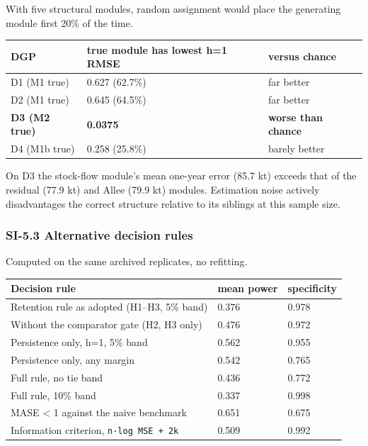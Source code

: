 \documentclass[11pt]{article}
\begin{document}
With five structural modules, random assignment would place the
generating module first 20\% of the time.

{\def\LTcaptype{none} %
\begin{longtable}[]{@{}lll@{}}
\toprule\noalign{}
DGP & true module has lowest h=1 RMSE & versus chance \\
\midrule\noalign{}
\endhead
\bottomrule\noalign{}
\endlastfoot
D1 (M1 true) & 0.627 (62.7\%) & far better \\
D2 (M1 true) & 0.645 (64.5\%) & far better \\
\textbf{D3 (M2 true)} & \textbf{0.0375} & \textbf{worse than chance} \\
D4 (M1b true) & 0.258 (25.8\%) & barely better \\
\end{longtable}
}

On D3 the stock-flow module's mean one-year error (85.7 kt) exceeds that
of the residual (77.9 kt) and Allee (79.9 kt) modules. Estimation noise
actively disadvantages the correct structure relative to its siblings at
this sample size.

\subsubsection{SI-5.3 Alternative decision
rules}\label{si-5.3-alternative-decision-rules}

Computed on the same archived replicates, no refitting.

{\def\LTcaptype{none} %
\begin{longtable}[]{@{}lll@{}}
\toprule\noalign{}
Decision rule & mean power & specificity \\
\midrule\noalign{}
\endhead
\bottomrule\noalign{}
\endlastfoot
Retention rule as adopted (H1--H3, 5\% band) & 0.376 & 0.978 \\
Without the comparator gate (H2, H3 only) & 0.476 & 0.972 \\
Persistence only, h=1, 5\% band & 0.562 & 0.955 \\
Persistence only, any margin & 0.542 & 0.765 \\
Full rule, no tie band & 0.436 & 0.772 \\
Full rule, 10\% band & 0.337 & 0.998 \\
MASE \textless{} 1 against the naive benchmark & 0.651 & 0.675 \\
Information criterion, \texttt{n·log\ MSE\ +\ 2k} & 0.509 & 0.992 \\
\end{longtable}
}
\end{document}
